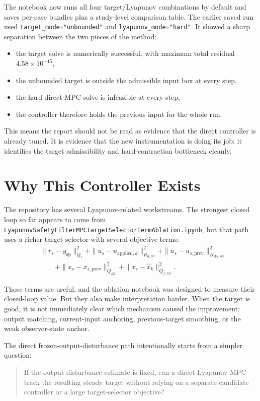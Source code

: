 \documentclass[11pt]{article}
\begin{document}
The notebook now runs all four target/Lyapunov combinations by default and saves
per-case bundles plus a study-level comparison table. The earlier saved run used
\texttt{target\_mode="unbounded"} and \texttt{lyapunov\_mode="hard"}. It showed
a sharp separation between the two pieces of the method:
\begin{itemize}[leftmargin=1.5em]
\item the target solve is numerically successful, with maximum total residual
\(4.58\times 10^{-15}\),
\item the unbounded target is outside the admissible input box at every step,
\item the hard direct MPC solve is infeasible at every step,
\item the controller therefore holds the previous input for the whole run.
\end{itemize}

This means the report should not be read as evidence that the direct controller
is already tuned. It is evidence that the new instrumentation is doing its job:
it identifies the target admissibility and hard-contraction bottleneck cleanly.

\section{Why This Controller Exists}

The repository has several Lyapunov-related workstreams. The strongest closed
loop so far appears to come from
\texttt{LyapunovSafetyFilterMPCTargetSelectorTermAblation.ipynb}, but that path
uses a richer target selector with several objective terms:
\begin{align}
&\|r_s-y_{\mathrm{sp}}\|_{Q_r}^2
+\|u_s-u_{\mathrm{applied},k}\|_{R_{u,\mathrm{ref}}}^2
+\|u_s-u_{s,\mathrm{prev}}\|_{R_{\Delta u,\mathrm{sel}}}^2 \nonumber \\
&\qquad
+\|x_s-x_{s,\mathrm{prev}}\|_{Q_{\Delta x}}^2
+\|x_s-\hat x_k\|_{Q_{x,\mathrm{ref}}}^2.
\label{eq:ablation_selector_objective}
\end{align}

Those terms are useful, and the ablation notebook was designed to measure their
closed-loop value. But they also make interpretation harder. When the target is
good, it is not immediately clear which mechanism caused the improvement:
output matching, current-input anchoring, previous-target smoothing, or the weak
observer-state anchor.

The direct frozen-output-disturbance path intentionally starts from a simpler
question:
\begin{quote}
If the output disturbance estimate is fixed, can a direct Lyapunov MPC track the
resulting steady target without relying on a separate candidate controller or a
large target-selector objective?
\end{quote}
\end{document}
